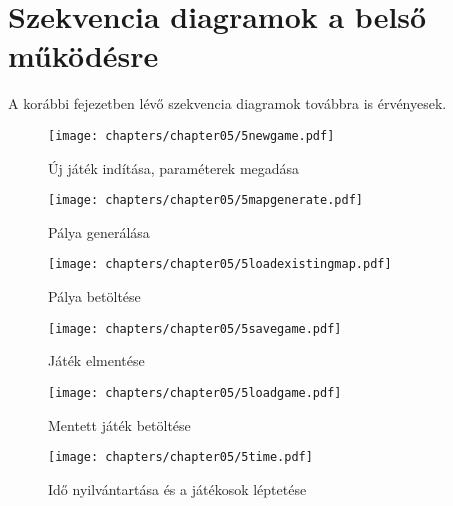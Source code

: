 \clearpage
\section{Szekvencia diagramok a belső működésre}

A korábbi fejezetben lévő szekvencia diagramok továbbra is érvényesek.

\begin{figure}[h]
	\begin{center}
		\texttt{[image: chapters/chapter05/5newgame.pdf]}
		\caption{Új játék indítása, paraméterek megadása}
		\label{fig:5newgame}
	\end{center}
\end{figure}

\begin{figure}[h]
	\begin{center}
		\texttt{[image: chapters/chapter05/5mapgenerate.pdf]}
		\caption{Pálya generálása}
		\label{fig:5mapgenerate}
	\end{center}
\end{figure}

\begin{figure}[h]
	\begin{center}
		\texttt{[image: chapters/chapter05/5loadexistingmap.pdf]}
		\caption{Pálya betöltése}
		\label{fig:5loadexistingmap}
	\end{center}
\end{figure}

\begin{figure}[h]
	\begin{center}
		\texttt{[image: chapters/chapter05/5savegame.pdf]}
		\caption{Játék elmentése}
		\label{fig:5savegame}
	\end{center}
\end{figure}

\begin{figure}[h]
	\begin{center}
		\texttt{[image: chapters/chapter05/5loadgame.pdf]}
		\caption{Mentett játék betöltése}
		\label{fig:5loadgame}
	\end{center}
\end{figure}

\begin{figure}[h]
	\begin{center}
		\texttt{[image: chapters/chapter05/5time.pdf]}
		\caption{Idő nyilvántartása és a játékosok léptetése}
		\label{fig:5time}
	\end{center}
\end{figure}
\clearpage

